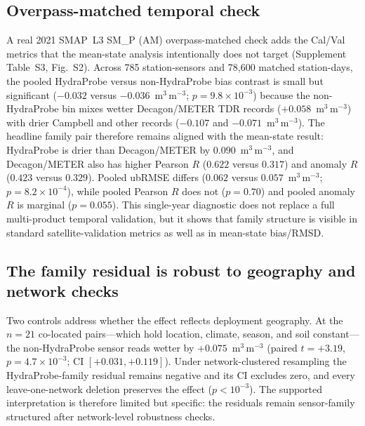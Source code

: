 \documentclass[journal]{IEEEtran}
\begin{document}
\subsection{Overpass-matched temporal check}
A real 2021 SMAP~L3 SM\_P (AM) overpass-matched check adds the Cal/Val
metrics that the mean-state analysis intentionally does not target
(Supplement Table~S3, Fig.~S2). Across 785 station-sensors and 78{,}600
matched station-days, the pooled HydraProbe versus non-HydraProbe bias
contrast is small but significant ($-0.032$ versus
$-0.036$~m$^3$\,m$^{-3}$; $p=9.8\times10^{-3}$) because the
non-HydraProbe bin mixes wetter Decagon/METER TDR records
($+0.058$~m$^3$\,m$^{-3}$) with drier Campbell and other records
($-0.107$ and $-0.071$~m$^3$\,m$^{-3}$). The headline family pair
therefore remains aligned with the mean-state result: HydraProbe is
drier than Decagon/METER by $0.090$~m$^3$\,m$^{-3}$, and Decagon/METER
also has higher Pearson $R$ ($0.622$ versus $0.317$) and anomaly $R$
($0.423$ versus $0.329$). Pooled ubRMSE differs ($0.062$ versus
$0.057$~m$^3$\,m$^{-3}$; $p=8.2\times10^{-4}$), while pooled Pearson
$R$ does not ($p=0.70$) and pooled anomaly $R$ is marginal ($p=0.055$).
This single-year diagnostic does not replace a full multi-product
temporal validation, but it shows that family structure is visible in
standard satellite-validation metrics as well as in mean-state
bias/RMSD.

\subsection{The family residual is robust to geography and network checks}
Two controls address whether the effect reflects deployment geography.
At the $n=21$ co-located pairs—which hold location, climate, season,
and soil constant—the non-HydraProbe sensor reads wetter by
$+0.075$~m$^3$\,m$^{-3}$ (paired $t=+3.19$, $p=4.7\times10^{-3}$; CI
$[+0.031,+0.119]$). Under network-clustered resampling the
HydraProbe-family residual remains negative and its CI excludes zero,
and every leave-one-network deletion preserves the effect
($p<10^{-3}$). The supported interpretation is therefore limited but
specific: the residuals remain sensor-family structured after
network-level robustness checks.
\end{document}
